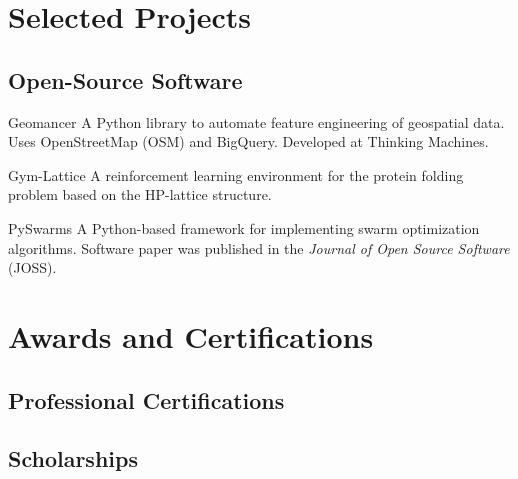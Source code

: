 \documentclass[12pt,a4paper]{moderncv}
\begin{document}
\section{Selected Projects}

\subsection{Open-Source Software}


{\color{blue}
    }
{Geomancer}{}{}
{
    A Python library to automate feature engineering of geospatial data. Uses
    OpenStreetMap (OSM) and BigQuery. Developed at Thinking Machines.
}

{\color{blue} }
{Gym-Lattice}{}{}
{
    A reinforcement learning environment for the protein folding problem based
    on the HP-lattice structure.
}

{\color{blue} }
{PySwarms}{}{}
{
    A Python-based framework for implementing swarm optimization
    algorithms. Software paper was published in the \textit{Journal of Open
        Source Software} (JOSS).
}


\section{Awards and Certifications}

\subsection{Professional Certifications}

\subsection{Scholarships}


\nocite{*}


\end{document}

